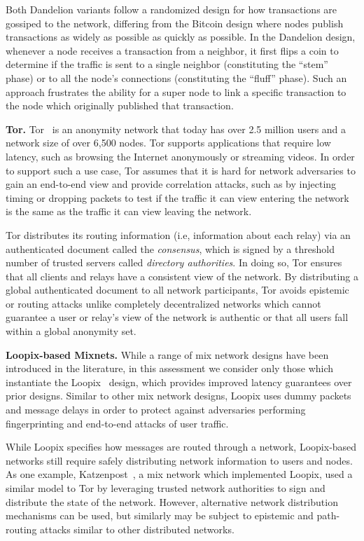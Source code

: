 \documentclass{article}
\begin{document}
Both Dandelion variants follow a randomized design for how transactions are
gossiped to the network, differing from the Bitcoin design where nodes publish
transactions as widely as possible as quickly as possible. In the Dandelion
design, whenever a node receives a transaction from a neighbor, it
first flips a coin to determine if the traffic is sent to a single
neighbor (constituting the ``stem'' phase) or to all the node's connections
(constituting the ``fluff'' phase). Such an approach frustrates the ability for
a super node to link a specific transaction to the node which originally
published that transaction.


\textbf{Tor.}
Tor~\cite{tor-specification} is an anonymity network that today has over 2.5
million users and a network
size of over 6,500 nodes. Tor supports applications that require low latency,
such as browsing the Internet anonymously or streaming videos. In order to
support such a use case, Tor assumes that it is hard for network adversaries to
gain an end-to-end view and provide correlation attacks, such as by injecting
timing or dropping packets to test if the traffic it can view entering the
network is the same as the traffic it can view leaving the network.

Tor distributes its routing information (i.e, information about each relay) via
an authenticated document called the \emph{consensus}, which is signed by a
threshold number of trusted servers called \emph{directory authorities}. In
doing so, Tor ensures that all clients and relays have a consistent view of the
network. By distributing a global authenticated document to all network
participants, Tor avoids epistemic or routing attacks unlike completely
decentralized networks which cannot guarantee a user or relay's view of the
network is authentic or that all users fall within a global anonymity set.


\textbf{Loopix-based Mixnets.}
While a range of mix network designs have been introduced in the literature, in
this assessment we consider only those which instantiate the
Loopix~\cite{Piotrowska:2017:LAS} design, which provides improved latency
guarantees over prior designs. Similar to other mix network designs, Loopix
uses dummy packets and message delays in order to protect against adversaries
performing fingerprinting and end-to-end attacks of user traffic.

While Loopix specifies how messages are routed through a network, Loopix-based
networks still require safely distributing network information to users and
nodes. As one example, Katzenpost~\cite{katzenpost}, a mix network which implemented
Loopix,  used a similar model to Tor
by leveraging trusted network authorities to sign and distribute the state of
the network. However, alternative network distribution mechanisms can be used,
but similarly may be subject to epistemic and path-routing attacks similar to
other distributed networks.
\end{document}
